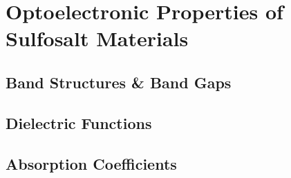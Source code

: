 \chapter{Optoelectronic Properties of Sulfosalt Materials}

\section{Band Structures \& Band Gaps}
\section{Dielectric Functions}
\section{Absorption Coefficients}
